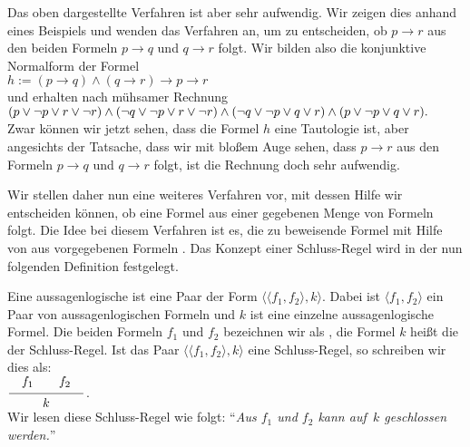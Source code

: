 Das oben dargestellte Verfahren ist aber sehr aufwendig.  Wir zeigen dies anhand eines
Beispiels und wenden das Verfahren
an, um zu entscheiden, ob $p \rightarrow r$ aus den beiden Formeln $p \rightarrow q$ und
$q \rightarrow r$ folgt.   Wir bilden also die konjunktive Normalform der Formel 
\\[0.2cm]
\hspace*{1.3cm}
$h := (p \rightarrow q) \wedge (q \rightarrow r) \rightarrow p \rightarrow r$
\\[0.2cm]
und erhalten nach mühsamer Rechnung
\\[0.2cm]
\hspace*{1.3cm}
$\displaystyle (p \vee \neg p \vee r \vee \neg r) \wedge (\neg q \vee \neg p \vee r \vee \neg r) \wedge
     (\neg q \vee \neg p \vee q \vee r) \wedge (p \vee \neg p \vee q \vee r).
$
\\[0.2cm]
Zwar können wir jetzt sehen, dass die Formel $h$ eine Tautologie ist, aber angesichts der
Tatsache, dass wir mit bloßem Auge sehen, dass  $p \rightarrow r$ aus den Formeln $p \rightarrow q$ und
$q \rightarrow r$ folgt, ist die Rechnung  doch  sehr aufwendig.

Wir stellen daher nun eine weiteres Verfahren vor, mit dessen Hilfe wir entscheiden
können, ob eine Formel aus einer gegebenen Menge von Formeln folgt.  Die Idee bei diesem Verfahren
ist es, die zu beweisende Formel mit Hilfe von  aus vorgegebenen Formeln 
.  Das Konzept einer Schluss-Regel wird in der nun folgenden Definition
festgelegt. 
\begin{Definition}
    Eine aussagenlogische  ist eine Paar der Form  $\bigl\langle \langle f_1, f_2 \rangle, k \bigr\rangle$.
    Dabei ist  $\langle f_1, f_2 \rangle$ ein Paar von aussagenlogischen Formeln und $k$ ist eine
    einzelne aussagenlogische Formel.  
    Die beiden Formeln $f_1$ und $f_2$ bezeichnen wir als
    , die Formel $k$ heißt die  der Schluss-Regel.
    Ist das Paar $\bigl\langle \langle f_1, f_2 \rangle, k \bigr\rangle$ eine Schluss-Regel, so
    schreiben wir dies als: 
    \\[0.3cm]
    \hspace*{1.3cm}      
    $\schluss{f_1 \qquad f_2}{k}$.
    \\[0.3cm]
    Wir lesen diese Schluss-Regel wie folgt: 
    ``\textsl{Aus $f_1$ und $f_2$ kann auf\, $k$ geschlossen werden.}''
    \eox
\end{Definition}
\vspace*{0.3cm}

